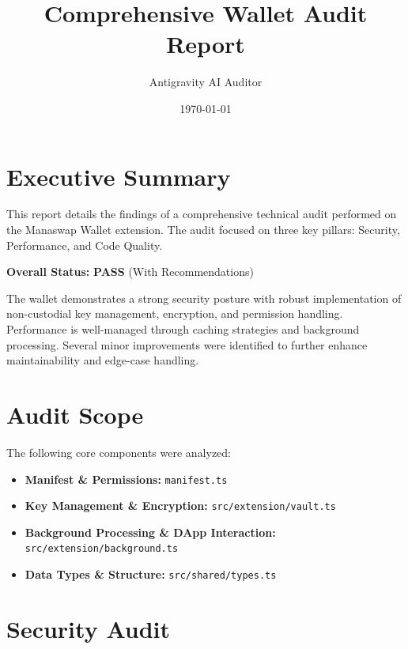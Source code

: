 \documentclass[11pt, a4paper]{article}
\title{\textbf{Comprehensive Wallet Audit Report}}
\author{Antigravity AI Auditor}
\date{\today}
\begin{document}
\maketitle

\section{Executive Summary}
This report details the findings of a comprehensive technical audit performed on the Manaswap Wallet extension. The audit focused on three key pillars: Security, Performance, and Code Quality.
\vspace{1em}

\textbf{Overall Status:} \textcolor{green!60!black}{\textbf{PASS}} (With Recommendations)
\vspace{1em}

The wallet demonstrates a strong security posture with robust implementation of non-custodial key management, encryption, and permission handling. Performance is well-managed through caching strategies and background processing. Several minor improvements were identified to further enhance maintainability and edge-case handling.

\section{Audit Scope}
The following core components were analyzed:
\begin{itemize}
    \item \textbf{Manifest \& Permissions:} \texttt{manifest.ts}
    \item \textbf{Key Management \& Encryption:} \texttt{src/extension/vault.ts}
    \item \textbf{Background Processing \& DApp Interaction:} \texttt{src/extension/background.ts}
    \item \textbf{Data Types \& Structure:} \texttt{src/shared/types.ts}
\end{itemize}

\section{Security Audit}
\end{document}
